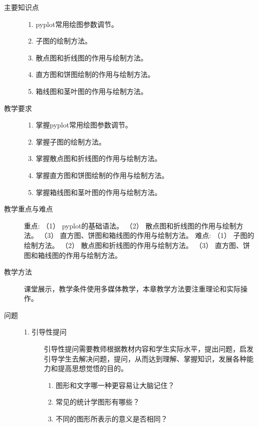 \documentclass[12pt,a4paper,openany,cap]{ctexbook}
\begin{document}
\begin{description}
\item[主要知识点]
  \begin{minipage}[t]{0.8\linewidth}
    \begin{enumerate}
    \item  pyplot常用绘图参数调节。
\item\label{item:82}  子图的绘制方法。
\item\label{item:83}  散点图和折线图的作用与绘制方法。
\item\label{item:84}  直方图和饼图绘制的作用与绘制方法。
\item\label{item:85}  箱线图和茎叶图的作用与绘制方法。
    \end{enumerate}
  \end{minipage}

\item[教学要求]
  \begin{minipage}[t]{0.8\linewidth}
    \begin{enumerate}
    \item  掌握pyplot常用绘图参数调节。
\item\label{item:86}  掌握子图的绘制方法。
\item\label{item:87}  掌握散点图和折线图的作用与绘制方法。
\item\label{item:88}  掌握直方图和饼图绘制的作用与绘制方法。
\item\label{item:89}  掌握箱线图和茎叶图的作用与绘制方法。
    \end{enumerate}
  \end{minipage}

  \item[教学重点与难点]
                 重点:
    （1） pyplot的基础语法。
    （2） 散点图和折线图的作用与绘制方法。
    （3） 直方图、饼图和箱线图的作用与绘制方法。
            难点:
    （1） 子图的绘制方法。
    （2） 散点图和折线图的作用与绘制方法。
    （3） 直方图、饼图和箱线图的作用与绘制方法。
\item[教学方法]课堂展示，教学条件使用多媒体教学，本章教学方法要注重理论和实际操作。
\item[问题]
  \begin{minipage}[t]{0.8\linewidth}
    \begin{description}
    \item[1. 引导性提问]
引导性提问需要教师根据教材内容和学生实际水平，提出问题，启发引导学生去解决问题，提问，从而达到理解、掌握知识，发展各种能力和提高思想觉悟的目的。
\begin{enumerate}
\item  图形和文字哪一种更容易让大脑记住？
\item\label{item:90}  常见的统计学图形有哪些？
\item\label{item:91}  不同的图形所表示的意义是否相同？
\end{enumerate}
            

\end{description}
\end{minipage}
\end{description}
\end{document}
